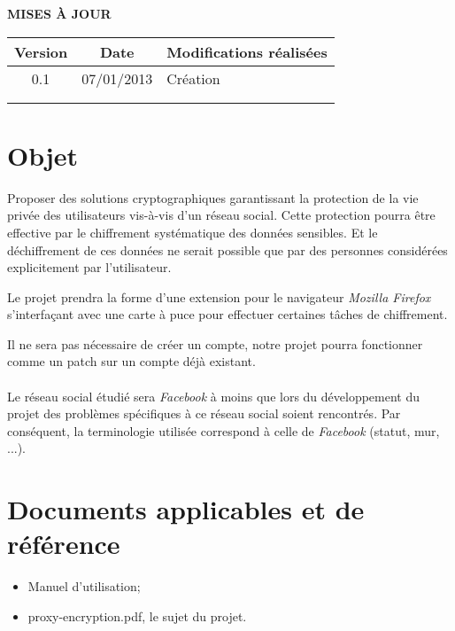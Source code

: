 \documentclass[a4paper,11pt,french]{article}
\begin{document}
\makeFirstPage
\clearpage

\vspace*{1cm}
\begin{center}
\textbf{\huge{MISES À JOUR}}\\
\vspace*{3cm}
	\begin{tabularx}{16cm}{|c|c|X|}
	\hline
	\bfseries{Version} & \bfseries{Date} & \bfseries{Modifications réalisées}\\
	\hline
	0.1 & 07/01/2013 & Création\\
	\hline
	&&\\
	\hline
	&&\\
	\hline
	\end{tabularx}
\end{center}

\clearpage
\tableofcontents
\clearpage

\section{Objet}
\renewcommand\labelitemi{\textbullet} %
\renewcommand\labelitemii{$\circ$} %
Proposer des solutions cryptographiques garantissant la protection de la vie 
privée des utilisateurs vis-à-vis d'un réseau social. Cette protection pourra
être effective par le chiffrement systématique des données sensibles. Et
le déchiffrement de ces données ne serait possible que par des personnes
considérées explicitement par l'utilisateur.

Le projet prendra la forme d'une extension pour le navigateur 
\emph{Mozilla Firefox}
s'interfaçant avec une carte à puce pour effectuer certaines tâches de 
chiffrement.

Il ne sera pas nécessaire de créer un compte, notre projet pourra fonctionner 
comme un patch sur un compte déjà existant.

\paragraph{}
Le réseau social étudié sera \emph{Facebook} à moins que lors du développement
du projet des problèmes spécifiques à ce réseau social soient rencontrés. 
Par conséquent, la terminologie utilisée correspond à celle de \emph{Facebook} 
(statut, mur, ...).

\section{Documents applicables et de référence}
\begin{itemize}
    \item Manuel d'utilisation;
    \item proxy-encryption.pdf, le sujet du projet.
\end{itemize}
\end{document}
